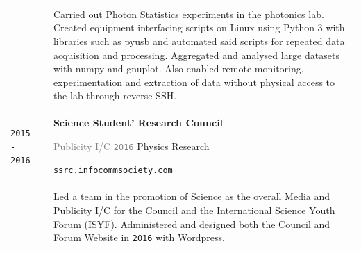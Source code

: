 \documentclass[11pt]{article}
\newcommand{\monoSp}[1]{{\usefont{T1}{rbtm}{m}{n} #1}}
\newcommand{\urllinkout}[2]{\href{#1}{\textcolor{text_link}{\small \texttt{#2}}}}
\newcommand{\code}[1]{\monoSp{#1}}
\begin{document}
{\begin{tabularx}{\textwidth}{@{}l p{0.3cm} X@{}}
		&& {\small Carried out Photon Statistics experiments in the photonics lab. Created equipment interfacing scripts on Linux using \code{Python 3} with libraries such as \code{pyusb} and automated said scripts for repeated data acquisition and processing. Aggregated and analysed large datasets with \code{numpy} and \code{gnuplot}. Also enabled remote monitoring, experimentation and extraction of data without physical access to the lab through reverse \code{SSH}. } \\
		\texttt{\large 2015 - 2016} & & \textbf{Science Student' Research Council} \par\textcolor{gray}{Publicity I/C \hspace{1em} \texttt{2016}} \hfill Physics Research\par \urllinkout{https://ssrc.infocommsociety.com/}{ssrc.infocommsociety.com}\\[-0.5em]
		&& {\small Led a team in the promotion of Science as the overall Media and Publicity I/C for the Council and the International Science Youth Forum {\footnotesize (ISYF)}. Administered and designed both the Council and Forum Website in \texttt{\large 2016} with \code{Wordpress}}. 
	\end{tabularx}
}
\end{document}
